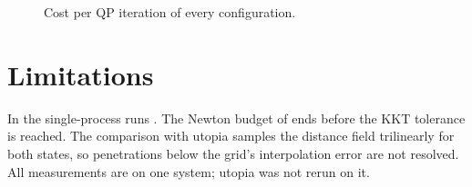 \documentclass[sigconf,nonacm]{acmart}
\begin{document}
\begin{table}
\caption{The overlap released over 1, 2 and 4 pseudo-steps, each solved to convergence, on
$4\times72$: Newton steps (those of failed attempts included) and solve time, median of
\releaseRepeats{} runs each, alternating per repeat.}
\label{tab:release}
\small

\end{table}

\begin{figure}
\centering

\caption{Cost per QP iteration of every configuration.}
\label{fig:per-iteration}
\end{figure}

\section{Limitations}

In the single-process runs \qpCappedClause{}. The Newton budget
of \unconvergedCases{} ends before the KKT tolerance is reached. The comparison with utopia samples
the distance field trilinearly for both states, so penetrations below the grid's interpolation
error are not resolved. All measurements are on one system; utopia was not rerun on it.



\end{document}
